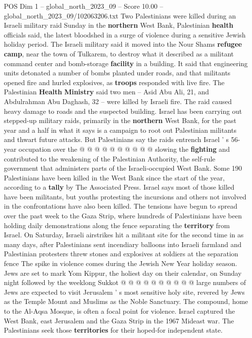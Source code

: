 \begin{textsample}{POS Dim 1 – global\_north\_2023\_09 – Score 10.00 – global\_north\_2023\_09/102063206.txt}  \label{ex:f1_pos_359}
Two Palestinians were killed during an Israeli military raid Sunday in the \textbf{northern} West Bank, Palestinian \textbf{health} officials said, the latest bloodshed in a surge of violence during a sensitive Jewish holiday period.
The Israeli military said it moved into the Nour Shams \textbf{refugee} \textbf{camp}, near the town of Tulkarem, to destroy what it described as a militant command center and bomb-storage \textbf{facility} in a building.
It said that engineering units detonated a number of bombs planted under roads, and that militants opened fire and hurled explosives, as \textbf{troops} responded with live fire.
The Palestinian \textbf{Health} \textbf{Ministry} said two men -- Asid Abu Ali, 21, and Abdulrahman Abu Daghash, 32 -- were killed by Israeli fire.
The raid caused heavy damage to roads and the suspected building.
Israel has been carrying out stepped-up military raids, primarily in the \textbf{northern} West Bank, for the past year and a half in what it says is a campaign to root out Palestinian militants and thwart future attacks.
But Palestinians say the raids entrench Israel ' s 56-year occupation over the @ @ @ @ @ @ @ @ @ @ slowing the \textbf{fighting} and contributed to the weakening of the Palestinian Authority, the self-rule government that administers parts of the Israeli-occupied West Bank.
Some 190 Palestinians have been killed in the West Bank since the start of the year, according to a \textbf{tally} by The Associated Press.
Israel says most of those killed have been militants, but youths protesting the incursions and others not involved in the confrontations have also been killed.
The tensions have begun to spread over the past week to the Gaza Strip, where hundreds of Palestinians have been holding daily demonstrations along the fence separating the \textbf{territory} from Israel.
On Saturday, Israeli airstrikes hit a militant site for the second time in as many days, after Palestinians sent incendiary balloons into Israeli farmland and Palestinian protesters threw stones and explosives at soldiers at the separation fence The spike in violence comes during the Jewish New Year holiday season.
Jews are set to mark Yom Kippur, the holiest day on their calendar, on Sunday night followed by the weeklong Sukkot @ @ @ @ @ @ @ @ @ @ large numbers of Jews are expected to visit Jerusalem ' s most sensitive holy site, revered by Jews as the Temple Mount and Muslims as the Noble Sanctuary.
The compound, home to the Al-Aqsa Mosque, is often a focal point for violence.
Israel captured the West Bank, east Jerusalem and the Gaza Strip in the 1967 Mideast war.
The Palestinians seek those \textbf{territories} for their hoped-for independent state.

\end{textsample}

